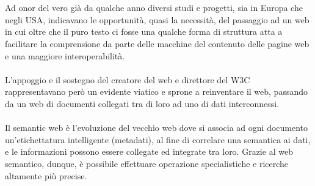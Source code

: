 \documentclass{article}
\theoremstyle{plain}
\theoremstyle{definition}
\begin{document}
\\ 
\\
Ad onor del vero già da qualche anno diversi studi e progetti, sia in Europa che negli USA, indicavano le opportunità, quasi la necessità, del passaggio ad un web in cui oltre che il puro testo ci fosse una qualche forma di struttura atta a facilitare la comprensione da parte delle macchine del contenuto delle pagine web e una maggiore interoperabilità. 
\\
\\
L'appoggio e il sostegno del creatore del web e direttore del W3C rappresentavano però un evidente viatico e sprone a reinventare il web, passando da un web di documenti collegati tra di loro ad uno di dati interconnessi.
\footnotemark
{}
\\
\\
Il semantic web è l'evoluzione del vecchio web dove si associa ad ogni documento un'etichettatura intelligente (metadati), al fine di correlare una semantica ai dati, e le informazioni possono essere collegate ed integrate tra loro. Grazie al web semantico, dunque, è possibile effettuare operazione specialistiche e ricerche altamente più precise.
\end{document}
